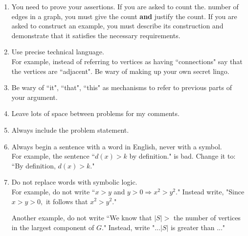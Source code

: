\documentclass[12pt]{article}
\renewcommand{\emph}[1]{\textsf{\textbf{#1}}}
\begin{document}
\begin{enumerate}
\item You need to prove your assertions. If you are asked to count the. number of edges in a graph, you must give the count \emph{and} justify the count. If you are asked to construct an example, you must describe its construction and demonstrate that it satisfies the necessary requirements.\\

\item Use precise technical language.\\

For example, instead of referring to vertices as having ``connections" say that the vertices are ``adjacent". Be wary of making up your own secret lingo.\\

\item Be wary of ``it", ``that", ``this"  as mechanisms to refer to previous parts of your argument.\\

\item Leave lots of space between problems for my comments.\\

\item Always include the problem statement.\\

\item Always begin a sentence with a word in English, never with a symbol. \\

For example, the sentence  ``$d(x) >k$ by definition." is bad. Change it to: ``By definition, $d(x) >k.$"\\

\item Do not replace words with symbolic logic. \\

For example, do not write ``$x > y$ and $y >0 \Longrightarrow x^2>y^2.$" Instead write, "Since $x>y>0,$ it follows that $x^2>y^2.$"

Another example, do not write ``We know that $|S| >$ the  number of vertices in the largest component of $G.$" Instead, write "...$|S|$ is greater than ..."

\end{enumerate}
\end{document}
